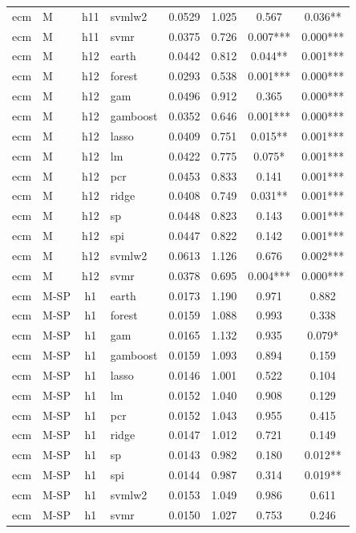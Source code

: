 \begin{ThreePartTable}
\begin{longtable}[t]{llclcccc}
ecm & M & h11 & svmlw2 & 0.0529 & 1.025 & 0.567 & 0.036**\\
ecm & M & h11 & svmr & 0.0375 & 0.726 & 0.007*** & 0.000***\\
\addlinespace
ecm & M & h12 & earth & 0.0442 & 0.812 & 0.044** & 0.001***\\
ecm & M & h12 & forest & 0.0293 & 0.538 & 0.001*** & 0.000***\\
ecm & M & h12 & gam & 0.0496 & 0.912 & 0.365 & 0.000***\\
ecm & M & h12 & gamboost & 0.0352 & 0.646 & 0.001*** & 0.000***\\
ecm & M & h12 & lasso & 0.0409 & 0.751 & 0.015** & 0.001***\\
ecm & M & h12 & lm & 0.0422 & 0.775 & 0.075* & 0.001***\\
ecm & M & h12 & pcr & 0.0453 & 0.833 & 0.141 & 0.001***\\
ecm & M & h12 & ridge & 0.0408 & 0.749 & 0.031** & 0.001***\\
ecm & M & h12 & sp & 0.0448 & 0.823 & 0.143 & 0.001***\\
ecm & M & h12 & spi & 0.0447 & 0.822 & 0.142 & 0.001***\\
ecm & M & h12 & svmlw2 & 0.0613 & 1.126 & 0.676 & 0.002***\\
ecm & M & h12 & svmr & 0.0378 & 0.695 & 0.004*** & 0.000***\\
\addlinespace
ecm & M-SP & h1 & earth & 0.0173 & 1.190 & 0.971 & 0.882\\
ecm & M-SP & h1 & forest & 0.0159 & 1.088 & 0.993 & 0.338\\
ecm & M-SP & h1 & gam & 0.0165 & 1.132 & 0.935 & 0.079*\\
ecm & M-SP & h1 & gamboost & 0.0159 & 1.093 & 0.894 & 0.159\\
ecm & M-SP & h1 & lasso & 0.0146 & 1.001 & 0.522 & 0.104\\
ecm & M-SP & h1 & lm & 0.0152 & 1.040 & 0.908 & 0.129\\
ecm & M-SP & h1 & pcr & 0.0152 & 1.043 & 0.955 & 0.415\\
ecm & M-SP & h1 & ridge & 0.0147 & 1.012 & 0.721 & 0.149\\
ecm & M-SP & h1 & sp & 0.0143 & 0.982 & 0.180 & 0.012**\\
ecm & M-SP & h1 & spi & 0.0144 & 0.987 & 0.314 & 0.019**\\
ecm & M-SP & h1 & svmlw2 & 0.0153 & 1.049 & 0.986 & 0.611\\
ecm & M-SP & h1 & svmr & 0.0150 & 1.027 & 0.753 & 0.246\\

\end{longtable}
\end{ThreePartTable}
